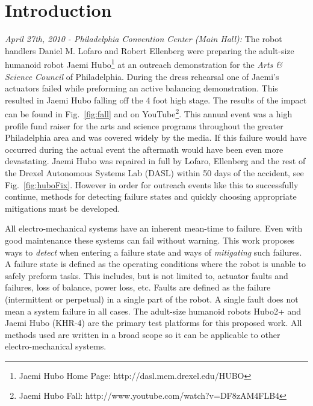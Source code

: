 \section{Introduction}
\label{sec:introduction}
\textit{April 27th, 2010 - Philadelphia Convention Center (Main Hall):} The
robot handlers Daniel M. Lofaro and Robert Ellenberg were preparing the
adult-size humanoid robot Jaemi Hubo\footnote{Jaemi Hubo Home Page:
	http://dasl.mem.drexel.edu/HUBO} at an outreach demonstration for the
\textit{Arts \& Science Council} of Philadelphia.  During the dress rehearsal
one of Jaemi's actuators failed while preforming an active balancing demonstration.  This resulted in
Jaemi Hubo falling off the 4 foot high stage.  The results of the impact can be found in
Fig.~\ref{fig:fall} and on YouTube\footnote{Jaemi Hubo Fall:
	http://www.youtube.com/watch?v=DF8zAM4FLB4}\label{link:fall}.  This annual
event was a high profile fund raiser for the arts and science programs
throughout the greater Philadelphia area and was covered widely by the media.
If this failure would have occurred during the actual event the aftermath would
have been even more devastating.  Jaemi Hubo was repaired in full by Lofaro, Ellenberg 
and the rest of the Drexel Autonomous Systems Lab (DASL) within 50 days of the accident, see Fig.~\ref{fig:huboFix}.  However 
in order for outreach events like this to
successfully continue, methods for detecting failure states and quickly
choosing appropriate mitigations must be developed.


All electro-mechanical systems have an inherent mean-time to failure.  Even
with good maintenance these systems can fail without warning.  This work
proposes ways to \textit{detect} when entering a failure state and ways of
\textit{mitigating} such failures.  A failure state is defined as the operating
conditions where the robot is unable to safely preform tasks.  This includes, but is
not limited to, actuator faults and failures, loss of balance, power loss, etc.
Faults are defined as the failure (intermittent or perpetual) in a single part
of the robot.  A single fault does not mean a system failure in all cases.  The
adult-size humanoid robots Hubo2+ and Jaemi Hubo (KHR-4) are the primary test
platforms for this proposed work.  All methods used are written in a broad
scope so it can be applicable to other electro-mechanical systems.

